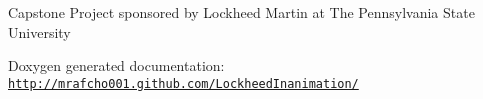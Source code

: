 Capstone Project sponsored by Lockheed Martin at The Pennsylvania State University

Doxygen generated documentation\-: \href{http://mrafcho001.github.com/LockheedInanimation/}{\tt http\-://mrafcho001.\-github.\-com/\-Lockheed\-Inanimation/} 